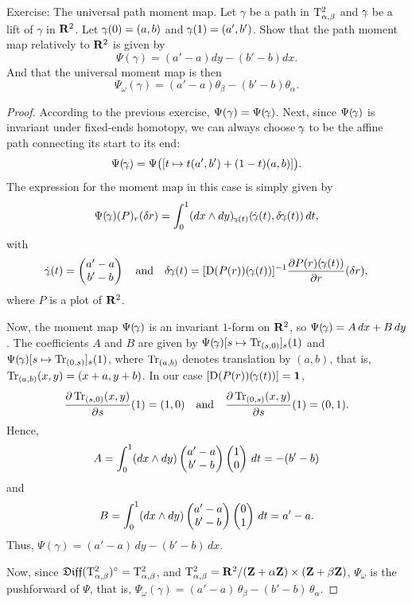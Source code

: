 \begin{Article}{Exercise: The universal path moment map.}{}
  Let $\gamma$ be a path in $\mathrm{T}^2_{\alpha,\beta}$ and $\bargamma$ be a lift of $\gamma$ in $\mathbf{R}^2$.
  Let $\bargamma(0)=(a,b)$ and $\bargamma(1)=(a',b')$.
  Show that the path moment map relatively to $\mathbf{R}^2$ is given by
  $$%
    \Psi(\gamma) = (a'-a)dy - (b'-b)dx.
    $$%
  And that the universal moment map is then
  $$%
    \Psi_\omega(\gamma) = (a'-a)\theta_\beta - (b'-b)\theta_\alpha.
    $$%
\end{Article}

\begin{proof}
  According to the previous exercise,
  $\Psi(\gamma) = \Psi(\bargamma)$.
  Next,
  since $\Psi(\bargamma)$ is invariant under fixed-ends homotopy,
  we can always choose $\bargamma$ to be the affine path connecting its start to its end:
  $$%
    \Psi(\bargamma) = \Psi\big([t \mapsto t(a',b') + (1-t)(a,b)]\big).
  $$%
  The expression for the moment map in this case is simply given by
  $$%
    \Psi(\bargamma)(P)_r(\delta r) = \int_0^1 (dx \wedge dy)_{\bargamma(t)}(\dot\bargamma(t), \delta\bargamma(t)) \, dt,
  $$%
  with
  $$%
    \dot\bargamma(t) = \Vector{a'-a \\ b'-b}
    \quad \text{and} \quad
    \delta\bargamma(t) = [\Der(P(r))(\bargamma(t))]^{-1}{\partial P(r)(\bargamma(t)) \over \partial r}(\delta r),
  $$%
  where $P$ is a plot of $\mathbf{R}^2$.
  
  Now,
  the moment map $\Psi(\bargamma)$ is an invariant $1$-form on $\mathbf{R}^2$,
  so $\Psi(\bargamma) = A\,dx + B\,dy$.
  The coefficients $A$ and $B$ are given by $\Psi(\bargamma)[s \mapsto \Trsl_{(s,0)}]_s(1)$ and $\Psi(\bargamma)[s \mapsto \Trsl_{(0,s)}]_s(1)$,
  where $\operatorname{Tr}_{(a,b)}$ denotes translation by $(a,b)$,
  that is,
  $\operatorname{Tr}_{(a,b)}(x,y) = (x+a, y+b)$.
    In our case $[\Der(P(r))(\bargamma(t))] = \Id$,
  $$%
    {\partial \Trsl_{(s,0)}(x,y) \over \partial s}(1) = (1,0) \quad \text{and} \quad
    {\partial \Trsl_{(0,s)}(x,y) \over \partial s}(1) = (0,1).
  $$%
  Hence,
  $$%
    A = \int_0^1 (dx \wedge dy)\Vector{a'-a \\ b'-b}\Vector{1 \\ 0} \, dt = -(b'-b)
  $$%
  and
  $$%
    B = \int_0^1 (dx \wedge dy)\Vector{a'-a \\ b'-b}\Vector{0 \\ 1} \, dt = a'-a.
  $$%
  Thus,
  $\Psi(\gamma) = (a'-a)\,dy - (b'-b)\,dx$.
  
  Now, since $\mathfrak{Diff}(\mathrm{T}^2_{\alpha,\beta})^\circ = \mathrm{T}^2_{\alpha,\beta}$,
  and $\mathrm{T}^2_{\alpha,\beta} = \mathbf{R}^2/(\mathbf{Z}+\alpha\mathbf{Z}) \times (\mathbf{Z}+\beta\mathbf{Z})$,
  $\Psi_\omega$ is the pushforward of $\Psi$,
  that is,
  $\Psi_\omega(\gamma) = (a'-a)\,\theta_\beta - (b'-b)\,\theta_\alpha$.
\end{proof}

